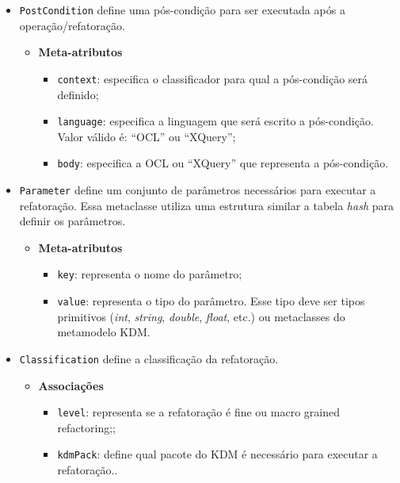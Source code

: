 \begin{itemize}
\item \texttt{PostCondition} define uma pós-condição para ser executada após a operação/refatoração.

\begin{itemize}
	\item \textbf{Meta-atributos}
		\begin{itemize}
			\item \texttt{context}: especifica o classificador para qual a pós-condição será definido;
			\item \texttt{language}: especifica a linguagem que será escrito a pós-condição. Valor válido é: ``OCL'' ou ``XQuery'';
			\item \texttt{body}: especifica a OCL ou ``XQuery'' que representa a pós-condição.
		\end{itemize}	
\end{itemize} 

\item \texttt{Parameter} define um conjunto de parâmetros necessários para executar a refatoração. Essa metaclasse utiliza uma estrutura similar a tabela \textit{hash} para definir os parâmetros.

\begin{itemize}
	\item \textbf{Meta-atributos}
		\begin{itemize}
			\item \texttt{key}: representa o nome do parâmetro;
			\item \texttt{value}: representa o tipo do parâmetro. Esse tipo deve ser tipos primitivos (\textit{int}, \textit{string}, \textit{double}, \textit{float}, etc.) ou metaclasses do metamodelo KDM.
		\end{itemize}	
\end{itemize} 

\item \texttt{Classification} define a classificação da refatoração.

\begin{itemize}
	\item \textbf{Associações}
		\begin{itemize}
			\item \texttt{level}: representa se a refatoração é fine ou macro grained refactoring;;
			\item \texttt{kdmPack}: define qual pacote do KDM é necessário para executar a refatoração..
		\end{itemize}	
\end{itemize} 


\end{itemize}
